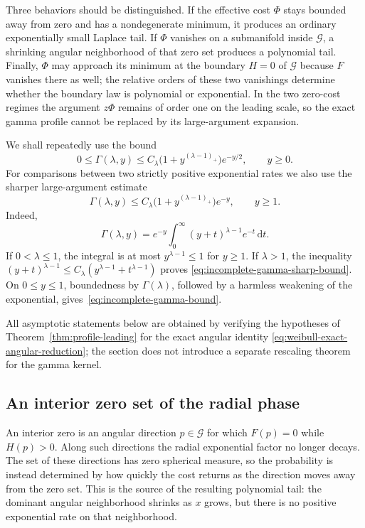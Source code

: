 \documentclass[11pt]{amsart}
\numberwithin{equation}{section}
\theoremstyle{definition}
\theoremstyle{remark}
\newcommand{\dd}{\,\mathrm{d}}
\begin{document}
Three behaviors should be distinguished.  If the effective cost $\Phi$ stays bounded away from zero and has a
nondegenerate minimum, it produces an ordinary exponentially small Laplace
tail.  If $\Phi$ vanishes on a submanifold inside $\mathcal G$, a
shrinking angular neighborhood of that zero set produces a polynomial tail.
Finally, $\Phi$ may approach its minimum at the boundary $H=0$ of
$\mathcal G$ because $F$ vanishes there as well; the relative orders of these
two vanishings determine whether the boundary law is polynomial or
exponential.  In the two zero-cost regimes the argument $z\Phi$ remains of
order one on the leading scale, so the exact gamma profile cannot be replaced
by its large-argument expansion.

We shall repeatedly use the bound
\begin{equation}\label{eq:incomplete-gamma-bound}
 0\le\Gamma(\lambda,y)
 \le C_\lambda\bigl(1+y^{(\lambda-1)_+}\bigr)e^{-y/2},
 \qquad y\ge0.
\end{equation}
For comparisons between two strictly positive exponential rates we also use
the sharper large-argument estimate
\begin{equation}\label{eq:incomplete-gamma-sharp-bound}
 \Gamma(\lambda,y)
 \le C_\lambda\bigl(1+y^{(\lambda-1)_+}\bigr)e^{-y},
 \qquad y\ge1.
\end{equation}
Indeed,
\[
 \Gamma(\lambda,y)
 =e^{-y}\int_0^\infty (y+t)^{\lambda-1}e^{-t}\dd t.
\]
If $0<\lambda\le1$, the integral is at most $y^{\lambda-1}\le1$ for
$y\ge1$.  If $\lambda>1$, the inequality
$(y+t)^{\lambda-1}\le C_\lambda(y^{\lambda-1}+t^{\lambda-1})$ proves
\eqref{eq:incomplete-gamma-sharp-bound}.  On $0\le y\le1$, boundedness by
$\Gamma(\lambda)$, followed by a harmless weakening of the exponential,
gives~\eqref{eq:incomplete-gamma-bound}.

All asymptotic statements below are obtained by verifying the hypotheses of
Theorem~\ref{thm:profile-leading} for the exact angular identity
\eqref{eq:weibull-exact-angular-reduction}; the section does not introduce a
separate rescaling theorem for the gamma kernel.

\subsection{An interior zero set of the radial phase}
\label{subsec:weibull-interior-zero}

An interior zero is an angular direction $p\in\mathcal G$ for which
$F(p)=0$ while $H(p)>0$.  Along such directions the radial exponential factor no longer decays.  The
set of these directions has zero spherical measure, so the probability is
instead determined by how quickly the cost returns as the direction moves
away from the zero set.  This is the source of the resulting polynomial
tail: the dominant angular neighborhood shrinks as $x$ grows, but there
is no positive exponential rate on that neighborhood.
\end{document}
